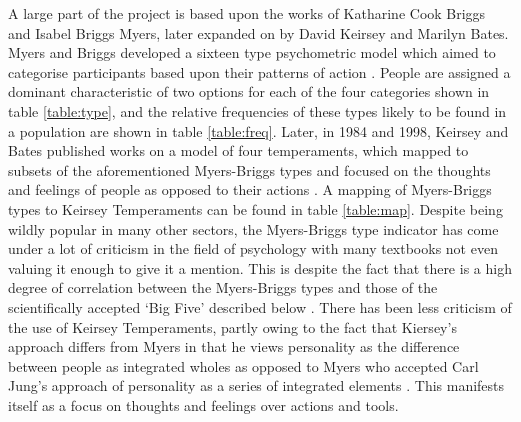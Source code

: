\documentclass[12pt,a4paper,twoside]{report}
\begin{document}
A large part of the project is based upon the works of Katharine Cook Briggs and Isabel Briggs Myers, later expanded on by David Keirsey and Marilyn Bates. Myers and Briggs developed a sixteen type psychometric model which aimed to categorise participants based upon their patterns of action \cite{myers1995gifts}. People are assigned a dominant characteristic of two options for each of the four categories shown in table \ref{table:type}, and the relative frequencies of these types likely to be found in a population are shown in table \ref{table:freq}. Later, in 1984 and 1998, Keirsey and Bates published works on a model of four temperaments, which mapped to subsets of the aforementioned Myers-Briggs types and focused on the thoughts and feelings of people as opposed to their actions \cite{keirsey1998please} \cite{keirsey1984}. A mapping of Myers-Briggs types to Keirsey Temperaments can be found in table \ref{table:map}. Despite being wildly popular in many other sectors, the Myers-Briggs type indicator has come under a lot of criticism in the field of psychology with many textbooks not even valuing it enough to give it a mention. This is despite the fact that there is a high degree of correlation between the Myers-Briggs types and those of the scientifically accepted `Big Five' described below \cite{lloyd2012myers}. There has been less criticism of the use of Keirsey Temperaments, partly owing to the fact that Kiersey's approach differs from Myers in that he views personality as the difference between people as integrated wholes as opposed to Myers who accepted Carl Jung's approach of personality as a series of integrated elements \cite{jung1923psychological} \cite{keirsey1998please} \cite{lloyd2012myers}. This manifests itself as a focus on thoughts and feelings over actions and tools.
\end{document}
